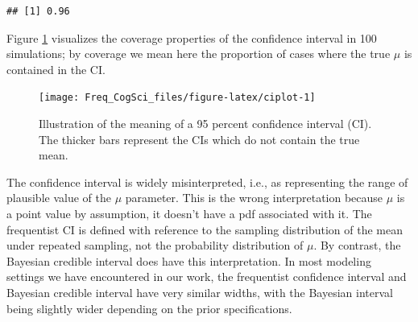 \documentclass[12pt,]{krantz}
\newenvironment{Shaded}{\begin{snugshade}}{\end{snugshade}}
\newcommand{\CommentTok}[1]{\textcolor[rgb]{0.56,0.35,0.01}{\textit{#1}}}
\newcommand{\ControlFlowTok}[1]{\textcolor[rgb]{0.13,0.29,0.53}{\textbf{#1}}}
\newcommand{\DataTypeTok}[1]{\textcolor[rgb]{0.13,0.29,0.53}{#1}}
\newcommand{\DecValTok}[1]{\textcolor[rgb]{0.00,0.00,0.81}{#1}}
\newcommand{\KeywordTok}[1]{\textcolor[rgb]{0.13,0.29,0.53}{\textbf{#1}}}
\newcommand{\NormalTok}[1]{#1}
\newcommand{\OperatorTok}[1]{\textcolor[rgb]{0.81,0.36,0.00}{\textbf{#1}}}
\newcommand{\OtherTok}[1]{\textcolor[rgb]{0.56,0.35,0.01}{#1}}
\newcommand{\StringTok}[1]{\textcolor[rgb]{0.31,0.60,0.02}{#1}}
\begin{document}
\begin{Shaded}
\end{Shaded}

\begin{verbatim}
## [1] 0.96
\end{verbatim}

Figure \ref{fig:ciplot} visualizes the coverage properties of the confidence interval in 100 simulations; by coverage we mean here the proportion of cases where the true \(\mu\) is contained in the CI.

\begin{figure}
\texttt{[image: Freq\_CogSci\_files/figure-latex/ciplot-1]} \caption{Illustration of the meaning of a  95 percent confidence interval (CI). The thicker bars represent the CIs which do not contain the true mean.}\label{fig:ciplot}
\end{figure}

The confidence interval is widely misinterpreted, i.e., as representing the range of plausible value of the \(\mu\) parameter. This is the wrong interpretation because \(\mu\) is a point value by assumption, it doesn't have a pdf associated with it. The frequentist CI is defined with reference to the sampling distribution of the mean under repeated sampling, not the probability distribution of \(\mu\).
By contrast, the Bayesian credible interval does have this interpretation.
In most modeling settings we have encountered in our work, the frequentist confidence interval and Bayesian credible interval have very similar widths, with the Bayesian interval being slightly wider depending on the prior specifications.
\end{document}
